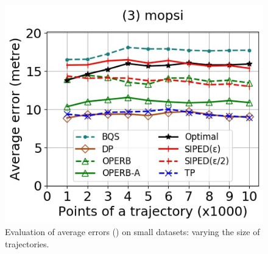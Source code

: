 {\begin{figure}[tb!]
	\includegraphics[scale=0.250]{Figures/Exp-PED-error-size-mopsi.jpg}		
	\vspace{-2ex}
	\caption{\small Evaluation of average errors (\ped) on small datasets: varying the size of
		trajectories.}
	\label{fig:ae-ped-size}
	\vspace{-2ex}
\end{figure}

}
